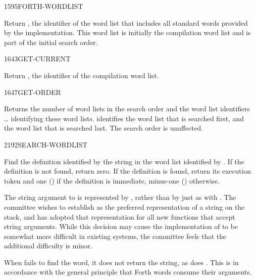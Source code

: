 \begin{worddef}{1595}{FORTH-WORDLIST}
\item {}

	Return , the identifier of the word list that includes
	all standard words provided by the implementation. This word list
	is initially the compilation word list and is part of the initial
	search order.
\end{worddef}


\begin{worddef}{1643}{GET-CURRENT}
\item {}

	Return , the identifier of the compilation word list.
\end{worddef}


\begin{worddef}{1647}{GET-ORDER}
\item {}

	Returns the number of word lists  in the search order
	and the word list identifiers  {\ldots} 
	identifying these word lists.  identifies the word
	list that is searched first, and  the word list that
	is searched last. The search order is unaffected.
\end{worddef}


\begin{worddef}{2192}{SEARCH-WORDLIST}
\item {}

	Find the definition identified by the string  in
	the word list identified by . If the definition is not
	found, return zero. If the definition is found, return its
	execution token  and one () if the definition is
	immediate, minus-one () otherwise.

	\begin{defer}
	\rationale %
		The string argument to  is represented
		by , rather than by just  as
		with . The committee wishes to establish
		 as the preferred representation of a string
		on the stack, and has adopted that representation for all new
		functions that accept string arguments. While this decision
		may cause the implementation of  to be
		somewhat more difficult in existing systems, the committee
		feels that the additional difficulty is minor.

		When  fails to find the word, it does
		not return the string, as does . This is in
		accordance with the general principle that Forth words consume
		their arguments.
	\end{defer}
\end{worddef}


